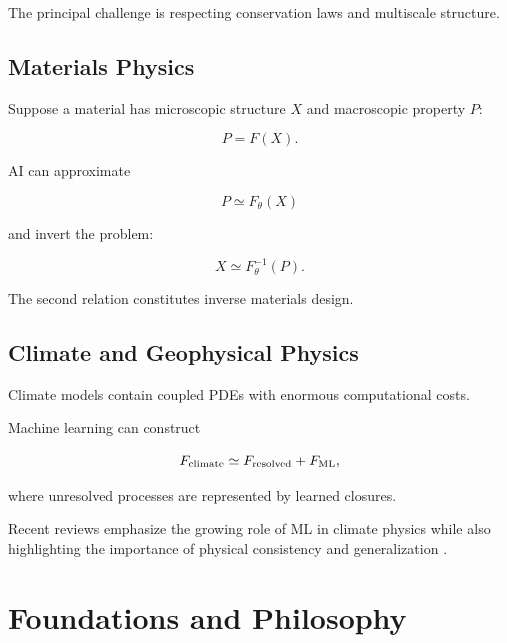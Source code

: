\documentclass[11pt,a4paper,oneside]{book}
\begin{document}
The principal challenge is respecting conservation laws and multiscale
structure.

\chapter{Materials Physics}

Suppose a material has microscopic structure $X$ and macroscopic property $P$:

\begin{equation}
P=F(X).
\end{equation}

AI can approximate

\begin{equation}
P\simeq F_\theta(X)
\end{equation}

and invert the problem:

\begin{equation}
X\simeq F_\theta^{-1}(P).
\end{equation}

The second relation constitutes inverse materials design.

\chapter{Climate and Geophysical Physics}

Climate models contain coupled PDEs with enormous computational costs.

Machine learning can construct

\begin{equation}
F_{\rm climate}
\simeq
F_{\rm resolved}
+
F_{\rm ML},
\end{equation}

where unresolved processes are represented by learned closures.

Recent reviews emphasize the growing role of ML in climate physics while also
highlighting the importance of physical consistency and generalization
\citep{Bracco2025}.

\part{Foundations and Philosophy}
\end{document}
